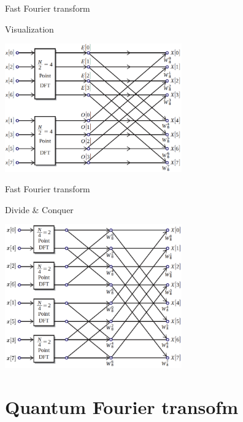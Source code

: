 \begin{frame}{Fast Fourier transform}

\begin{block}{Visualization}

\centerline{\includegraphics[width=3in]{c.png}}

\end{block}

\end{frame}

\begin{frame}{Fast Fourier transform}

\begin{block}{Divide \& Conquer}

\centerline{\includegraphics[width=3in]{cc.png}}

\end{block}

\end{frame}

\section{Quantum Fourier transofm}\label{quantum-fourier-transofm}

